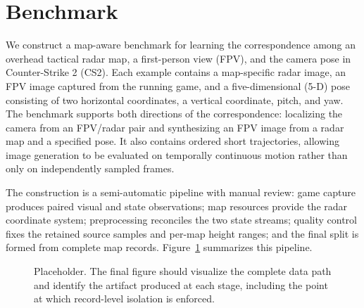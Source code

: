 \section{Benchmark}
\label{sec:benchmark}


We construct a map-aware benchmark for learning the correspondence among an overhead tactical radar map, a first-person view (FPV), and the camera pose in Counter-Strike 2 (CS2).
Each example contains a map-specific radar image, an FPV image captured from the running game, and a five-dimensional (5-D) pose consisting of two horizontal coordinates, a vertical coordinate, pitch, and yaw.
The benchmark supports both directions of the correspondence: localizing the camera from an FPV/radar pair and synthesizing an FPV image from a radar map and a specified pose.
It also contains ordered short trajectories, allowing image generation to be evaluated on temporally continuous motion rather than only on independently sampled frames.

The construction is a semi-automatic pipeline with manual review: game capture produces paired visual and state observations; map resources provide the radar coordinate system; preprocessing reconciles the two state streams; quality control fixes the retained source samples and per-map height ranges; and the final split is formed from complete map records.
Figure~\ref{fig:cs2-benchmark-pipeline} summarizes this pipeline.

\begin{figure}[t]
    \centering
    \caption{Placeholder.  The final figure should visualize the complete
    data path and identify the artifact produced at each stage, including
    the point at which record-level isolation is enforced.}
    \label{fig:cs2-benchmark-pipeline}
\end{figure}



